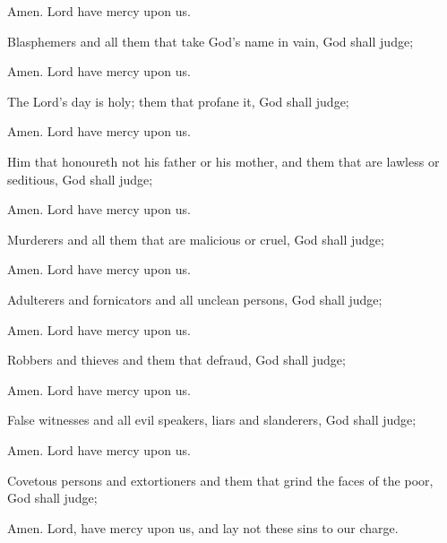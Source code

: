 \R Amen.  Lord have mercy upon us.

Blasphemers and all them that take God’s name in vain, God shall judge; 

\R Amen.  Lord have mercy upon us.

The Lord’s day is holy; them that profane it, God shall judge;

\R Amen.  Lord have mercy upon us.

Him that honoureth not his father or his mother, and them that are lawless or seditious, God shall judge;

\R Amen.  Lord have mercy upon us.

Murderers and all them that are malicious or cruel, God shall judge;

\R Amen.  Lord have mercy upon us.

Adulterers and fornicators and all unclean persons, God shall judge;

\R Amen.  Lord have mercy upon us.

Robbers and thieves and them that defraud, God shall judge;

\R Amen.  Lord have mercy upon us.

False witnesses and all evil speakers, liars and slanderers, God shall judge;

\R Amen.  Lord have mercy upon us.

Covetous persons and extortioners and them that grind the faces of the poor, God shall judge;

\R Amen. Lord, have mercy upon us, and lay not these sins to our charge.


\centerline{}

